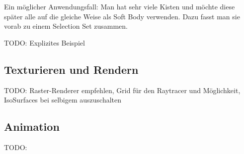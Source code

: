 \documentclass[10pt,DIV=14,a4paper]{scrartcl}
\begin{document}
Ein möglicher Anwendungsfall: Man hat sehr viele Kisten und möchte diese
später alle auf die gleiche Weise als Soft Body verwenden. Dazu fasst
man sie vorab zu einem Selection Set zusammen.

TODO: Explizites Beispiel

\subsection{Texturieren und Rendern}
TODO: Raster-Renderer empfehlen, Grid für den Raytracer und Möglichkeit,
IsoSurfaces bei selbigem auszuschalten

\subsection{Animation}
TODO:

\end{document}
